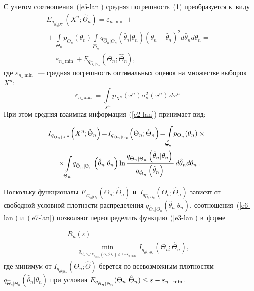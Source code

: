 \begin{multicols}{2}
С учетом соотношения~(\ref{e5-lan}) средняя по\-греш\-ность~(1) преобразуется к~виду 
\begin{multline}
E_{q_{\hat{\Theta}_n\vert X^n}}\left(X^n;\hat{\Theta}_n\right) = \varepsilon_{n\_\min} +{}\\
{}+\int\limits_{\Theta_n}  p_{\Theta_n} (\theta_n) \!
\int\limits_{\hat{\Theta}_n}  q_{\hat{\Theta}_n\vert \Theta_n}
\left(\hat{\theta}_n\vert \theta_n\right) \left(\theta_n-\hat{\theta}_n\right)^2 d\hat{\theta}_nd\theta_n = {}\\
{}=
\varepsilon_{n\_\min} +E_{q_{\hat{\Theta}_n\vert\Theta_n}}(\Theta_n; \hat{\Theta}_n),
\label{e6-lan}
\end{multline}
где $\varepsilon_{n\_\min}$~--- средняя по\-греш\-ность оптимальных оценок на множестве выборок~$X^n$:
$$
\varepsilon_{n\_\min}=\int\limits_{X^n} p_{X^n} (x^n) \sigma_n^2 (x^n)\,dx^n.
$$  
 При этом сред\-няя 
взаимная информация~(\ref{e2-lan}) принимает вид: 

\vspace*{-3pt}

\noindent
\begin{multline}
\! \! I_{q_{\hat{\Theta}_n\vert X^n}} \!\left(X^n; \hat{\Theta}_n\right) \!=\!I_{q_{\hat{\Theta}_n\vert\Theta_n}} 
\!\left(\Theta_n;\hat{\Theta}_n\right) \!=\! \int\limits_{\Theta_n} \!p_{\Theta_n}(\theta_n)\times{}\\
\!{}\times\!
 \int\limits_{\hat{\Theta}_n} \!
q_{\hat{\Theta}_n\vert \Theta_n} \left(\hat{\theta}_n\vert \theta_n\right) \ln \fr{q_{\hat{\Theta}_n\vert 
\Theta_n} \left(\hat{\theta}_n\vert \theta_n\right)}{q_{\hat{\Theta}_n}\left(\hat{\theta}_n\right)}\,d\hat{\theta}_n 
d\theta_n\,.\!\!
\label{e7-lan}
\end{multline}

\vspace*{-3pt}

\noindent
Поскольку функционалы $E_{q_{\hat{\Theta}_n\vert \Theta_n}} (\Theta_n; \hat{\Theta}_n)$ 
и~$I_{q_{\hat{\Theta}_n\vert \Theta_n }} (\Theta_n; \hat{\Theta}_n)$ зависят от свободной 
условной плотности распределения $q_{\hat{\Theta}_n\vert\Theta_n} (\hat{\theta}_n\vert 
\theta_n)$, соотношения~(\ref{e6-lan}) и~(\ref{e7-lan}) поз\-во\-ля\-ют переопределить 
функцию~(\ref{e3-lan}) в~форме 

\noindent
\begin{multline}
R_n(\varepsilon) ={}\\
\!{}=\!\!\min\limits_{q_{\hat{\Theta}_n\vert \Theta_n: E_{q_{\hat{\Theta}_n\vert 
\Theta_n}} (\Theta_n;\hat{\Theta}_n)\leq \varepsilon -\varepsilon_{n\_\min}}} \!\!I_{q_{\hat{\Theta}_n\vert \Theta_n}}(\Theta_n;\hat{\Theta}_n),\!
\label{e8-lan} 
\end{multline}
где минимум от $I_{q_{\hat{\Theta}\vert \Theta_n}}(\Theta_n; \hat{\Theta})$ берется по 
всевозможным плотностям $q_{\hat{\Theta}_n\vert \Theta_n} (\hat{\theta}_n\vert \theta_n)$ при 
условии  $E_{q_{\hat{\Theta}_n\vert \Theta_n}}(\Theta_n; \hat{\Theta}_n)\hm\leq \varepsilon\hm- 
\varepsilon_{n\_\min}$.


\end{multicols}
